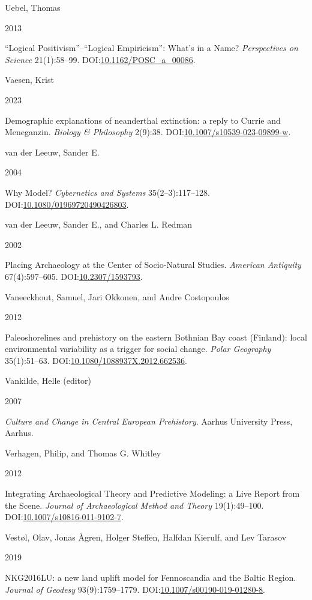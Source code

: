 \documentclass[
  12pt,
  a4paper,
  oneside]{book}
\newlength{\cslhangindent}
\newlength{\csllabelwidth}
\newlength{\cslentryspacingunit} %
\newenvironment{CSLReferences}[2] %
 {%
  \setlength{\parindent}{0pt}
  \ifodd #1
  \let\oldpar\par
  \def\par{\hangindent=\cslhangindent\oldpar}
  \fi
  \setlength{\parskip}{#2\cslentryspacingunit}
 }%
 {}
\newcommand{\CSLBlock}[1]{#1\hfill\break}
\newcommand{\CSLLeftMargin}[1]{\parbox[t]{\csllabelwidth}{#1}}
\newcommand{\CSLRightInline}[1]{\parbox[t]{\linewidth - \csllabelwidth}{#1}\break}
\begin{document}
\begin{CSLReferences}{0}{0}
\leavevmode{}%
\CSLBlock{Uebel, Thomas}
\CSLLeftMargin{ 2013}%
\CSLRightInline{{{``Logical Positivism''}--{``Logical Empiricism''}: What's in a Name?} \emph{Perspectives on Science} 21(1):58--99. DOI:\href{https://doi.org/10.1162/POSC_a_00086}{10.1162/POSC\_a\_00086}.}

\leavevmode{}%
\CSLBlock{Vaesen, Krist}
\CSLLeftMargin{ 2023}%
\CSLRightInline{Demographic explanations of neanderthal extinction: a reply to Currie and Meneganzin. \emph{Biology \& Philosophy} 2(9):38. DOI:\href{https://doi.org/10.1007/s10539-023-09899-w}{10.1007/s10539-023-09899-w}.}

\leavevmode{}%
\CSLBlock{van der Leeuw, Sander E.}
\CSLLeftMargin{ 2004}%
\CSLRightInline{{Why Model?} \emph{Cybernetics and Systems} 35(2--3):117--128. DOI:\href{https://doi.org/10.1080/01969720490426803}{10.1080/01969720490426803}.}

\leavevmode{}%
\CSLBlock{van der Leeuw, Sander E., and Charles L. Redman}
\CSLLeftMargin{ 2002}%
\CSLRightInline{{Placing Archaeology at the Center of Socio-Natural Studies}. \emph{American Antiquity} 67(4):597--605. DOI:\href{https://doi.org/10.2307/1593793}{10.2307/1593793}.}

\leavevmode{}%
\CSLBlock{Vaneeckhout, Samuel, Jari Okkonen, and Andre Costopoulos}
\CSLLeftMargin{ 2012}%
\CSLRightInline{{Paleoshorelines and prehistory on the eastern Bothnian Bay coast (Finland): local environmental variability as a trigger for social change}. \emph{Polar Geography} 35(1):51--63. DOI:\href{https://doi.org/10.1080/1088937X.2012.662536}{10.1080/1088937X.2012.662536}.}

\leavevmode{}%
\CSLBlock{Vankilde, Helle (editor)}
\CSLLeftMargin{ 2007}%
\CSLRightInline{\emph{{Culture and Change in Central European Prehistory}}. Aarhus University Press, Aarhus.}

\leavevmode{}%
\CSLBlock{Verhagen, Philip, and Thomas G. Whitley}
\CSLLeftMargin{ 2012}%
\CSLRightInline{{Integrating Archaeological Theory and Predictive Modeling: a Live Report from the Scene}. \emph{Journal of Archaeological Method and Theory} 19(1):49--100. DOI:\href{https://doi.org/10.1007/s10816-011-9102-7}{10.1007/s10816-011-9102-7}.}

\leavevmode{}%
\CSLBlock{Vestøl, Olav, Jonas Ågren, Holger Steffen, Halfdan Kierulf, and Lev Tarasov}
\CSLLeftMargin{ 2019}%
\CSLRightInline{{NKG2016LU: a new land uplift model for Fennoscandia and the Baltic Region}. \emph{Journal of Geodesy} 93(9):1759--1779. DOI:\href{https://doi.org/10.1007/s00190-019-01280-8}{10.1007/s00190-019-01280-8}.}


\end{CSLReferences}
\end{document}
